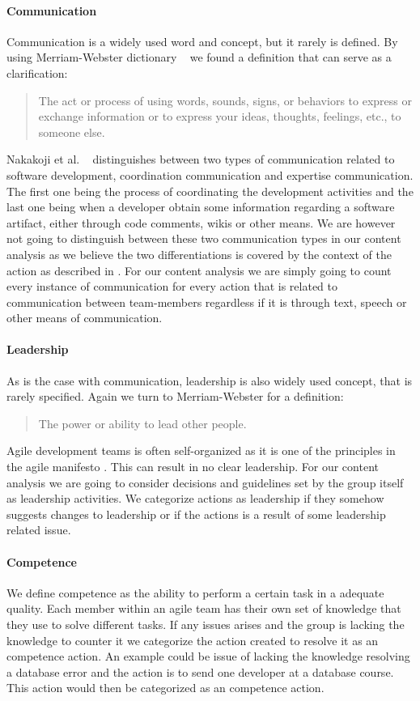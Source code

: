 \paragraph{Communication}
Communication is a widely used word and concept, but it rarely is defined. By using Merriam-Webster dictionary ~\cite{MerriamWebster2015} we found a definition that can serve as a clarification: 
\begin{quote}
The act or process of using words, sounds, signs, or behaviors to express or exchange information or to express your ideas, thoughts, feelings, etc., to someone else.
\end{quote}
Nakakoji et al. ~\cite{Nakakoji2010} distinguishes between two types of communication related to software development, coordination communication and expertise communication. The first one being the process of coordinating the development activities and the last one being when a developer obtain some information regarding a software artifact, either through code comments, wikis or other means. 
We are however not going to distinguish between these two communication types in our content analysis as we believe the two differentiations is covered by the context of the action as described in . For our content analysis we are simply going to count every instance of communication for every action that is related to communication between team-members regardless if it is through text, speech or other means of communication.
\paragraph{Leadership}
As is the case with communication, leadership is also widely used concept, that is rarely specified. Again we turn to Merriam-Webster \cite{MerriamWebster2015} for a definition: 
\begin{quote}
The power or ability to lead other people.
\end{quote}
Agile development teams is often self-organized as it is one of the principles in the agile manifesto \cite{AgileManifesto2015}. This can result in no clear leadership. For our content analysis we are going to consider decisions and guidelines set by the group itself as leadership activities. We categorize actions as leadership if they somehow suggests changes to leadership or if the actions is a result of some leadership related issue. 
\paragraph{Competence}
We define competence as the ability to perform a certain task in a adequate quality. Each member within an agile team has their own set of knowledge that they use to solve different tasks. If any issues arises and the group is lacking the knowledge to counter it we categorize the action created to resolve it as an competence action. An example could be issue of lacking the knowledge resolving a database error and the action is to send one developer at a database course. This action would then be categorized as an competence action.
